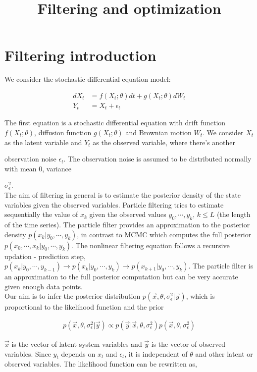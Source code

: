 \documentclass[a4paper,11pt]{article}
\begin{document}
\pagestyle{empty}
\title{Filtering and optimization}
\section{Filtering introduction}

We consider the stochastic differential equation model:

\begin{align*}
d X_t & = f(X_t; \theta) dt + g(X_t ; \theta) dW_t \\
Y_t & = X_t + \epsilon_t
\end{align*}

The first equation is a stochastic differential equation with drift function $f(X_t; \theta)$, diffusion function $g(X_t; \theta)$ and Brownian motion $W_t$. We consider $X_t$ as the latent variable and $Y_t$ as the observed variable, where there's another

observation noise $\epsilon_t$. The observation noise is assumed to be distributed normally with mean 0, variance

$\sigma^2_{\epsilon}$. \\

The aim of filtering in general is to estimate the posterior density of the state variables given the observed variables. Particle filtering tries to estimate sequentially the value of $x_k$ given the observed values $y_0, \cdots, y_k$, $k \leq L$ (the length of the time series). The particle filter provides an approximation to the posterior density $p(x_k | y_0, \cdots, y_k)$, in contrast to MCMC which computes the full posterior $p(x_0, \cdots, x_k | y_0, \cdots, y_k)$. The nonlinear filtering equation follows a recursive updation - prediction step, $p(x_k | y_0, \cdots, y_{k-1}) \to p(x_k | y_0, \cdots, y_{k}) \to p(x_{k+1} | y_0, \cdots, y_{k})$. The particle filter is an approximation to the full posterior computation but can be very accurate given enough data points.\\

Our aim is to infer the posterior distribution $p(\vec{x}, \theta, \sigma^2_{\epsilon} | \vec{y})$, which is proportional to the likelihood function and the prior

\begin{align*}
p(\vec{x}, \theta, \sigma^2_{\epsilon} | \vec{y}) \propto p(\vec{y} | \vec{x}, \theta, \sigma^2_{\epsilon}) p(\vec{x}, \theta, \sigma^2_{\epsilon})
\end{align*}

$\vec{x}$ is the vector of latent system variables and $\vec{y}$ is the vector of observed variables. Since $y_t$ depends on $x_t$ and $\epsilon_t$, it is independent of $\theta$ and other latent or observed variables. The likelihood function can be rewritten as,
\end{document}
